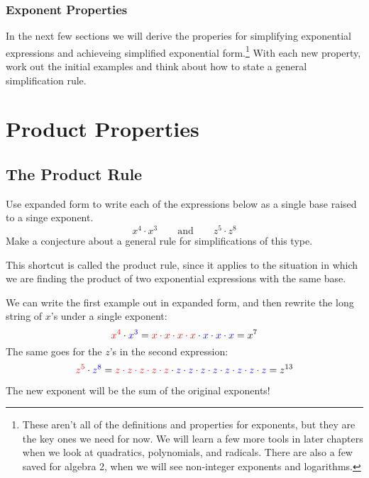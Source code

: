 \subsubsection{Exponent Properties}

In the next few sections we will derive the properies for simplifying exponential expressions and achieveing simplified exponential form.\footnote{These aren't all of the definitions and properties for exponents, but they are the key ones we need for now. We will learn a few more tools in later chapters when we look at quadratics, polynomials, and radicals. There are also a few saved for algebra 2, when we will see non-integer exponents and logarithms.} With each new property, work out the initial examples and think about how to state a general simplification rule.

\section{Product Properties}
\label{sec:expoproduct}

\subsection{The Product Rule}

\begin{boxedexplore}
Use expanded form to write each of the expressions below as a single base raised to a singe exponent.
\[x^4 \cdot x^3 \qquad\text{and}\qquad z^5 \cdot z^8\]
Make a conjecture about a general rule for simplifications of this type.
\end{boxedexplore}

This shortcut is called the product rule, since it applies to the situation in which we are finding the product of two exponential expressions with the same base.

We can write the first example out in expanded form, and then rewrite the long string of $x$'s under a single exponent:
\[{\color{red}x^4} \cdot {\color{blue}x^3} = {\color{red}x \cdot x \cdot x \cdot x} \cdot {\color{blue}x \cdot x \cdot x} = x^7\]
The same goes for the $z$'s in the second expression:
\[{\color{red}z^5} \cdot {\color{blue}z^8} = {\color{red}z \cdot z \cdot z \cdot z \cdot z} \cdot {\color{blue}z \cdot z \cdot z \cdot z \cdot z \cdot z \cdot z \cdot z} = z^{13}\]

The new exponent will be the sum of the original exponents!

